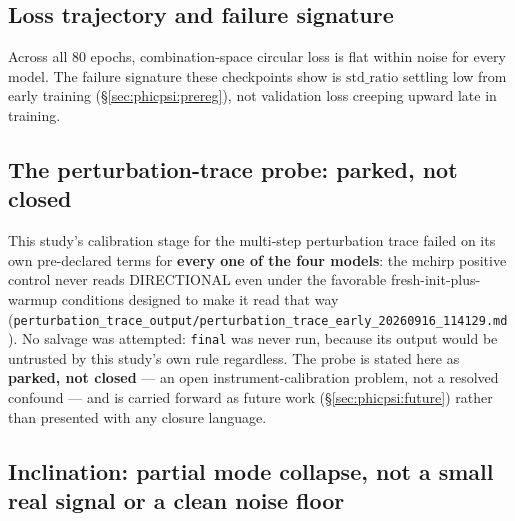 \subsection{Loss trajectory and failure signature}
\label{sec:phicpsi:lam0}

Across all 80 epochs, combination-space circular loss is flat within noise for every model.
The failure signature these checkpoints show is $\text{std\_ratio}$ settling low from early training (\S\ref{sec:phicpsi:prereg}), not validation loss creeping upward late in training.

\subsection{The perturbation-trace probe: parked, not closed}
\label{sec:phicpsi:perturbation}

This study's calibration stage for the multi-step perturbation trace failed on its own pre-declared terms for \textbf{every one of the four models}: the mchirp positive control never reads DIRECTIONAL even under the favorable fresh-init-plus-warmup conditions designed to make it read that way (\texttt{perturbation\_trace\_output/perturbation\_trace\_early\_20260916\_114129.md}).
No salvage was attempted: \texttt{final} was never run, because its output would be untrusted by this study's own rule regardless.
The probe is stated here as \textbf{parked, not closed} --- an open instrument-calibration problem, not a resolved confound --- and is carried forward as future work (\S\ref{sec:phicpsi:future}) rather than presented with any closure language.

\subsection{Inclination: partial mode collapse, not a small real signal or a clean noise floor}
\label{sec:phicpsi:inclination}

